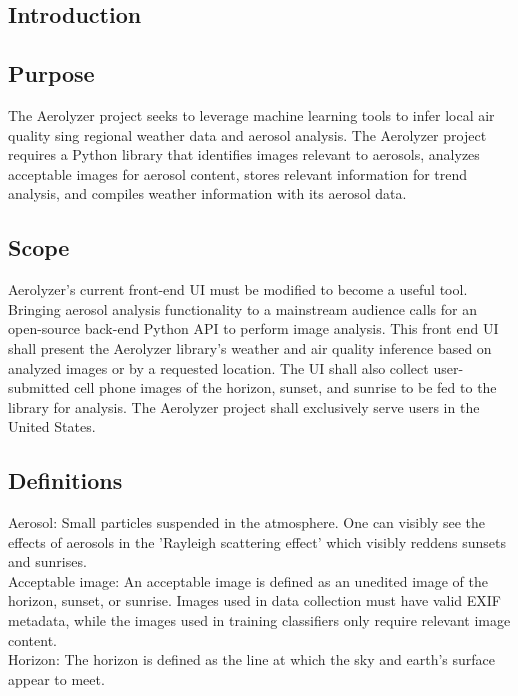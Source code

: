 \documentclass[journal,10pt,draftclsnofoot,onecolumn]{IEEEtran}
\begin{document}
\begin{singlespace}

\section{Introduction}

\subsection{Purpose}
The Aerolyzer project seeks to leverage machine learning tools to infer local air quality sing regional weather data and aerosol analysis. The Aerolyzer project requires a Python library that identifies images relevant to aerosols, analyzes acceptable images for aerosol content, stores relevant information for trend analysis, and compiles weather information with its aerosol data. 

\subsection{Scope}
Aerolyzer's current front-end UI must be modified to become a useful tool. Bringing aerosol analysis functionality to a mainstream audience calls for an open-source back-end Python API to perform image analysis. This front end UI shall present the Aerolyzer library's weather and air quality inference based on analyzed images or by a requested location. The UI shall also collect user-submitted cell phone images of the horizon, sunset, and sunrise to be fed to the library for analysis. The Aerolyzer project shall exclusively serve users in the United States.

\subsection{Definitions}
Aerosol: Small particles suspended in the atmosphere. One can visibly see the effects of aerosols in the 'Rayleigh scattering effect' which visibly reddens sunsets and sunrises. \\

Acceptable image: An acceptable image is defined as an unedited image of the horizon, sunset, or sunrise. Images used in data collection must have valid EXIF metadata, while the images used in training classifiers only require relevant image content.\\

Horizon: The horizon is defined as the line at which the sky and earth's surface appear to meet.\\


\end{singlespace}
\end{document}
